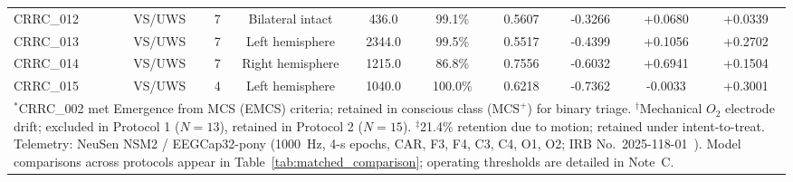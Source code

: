 \begin{table}[!ht]
\begin{tabular*}{\linewidth}{@{\extracolsep{\fill}}lccccccccc}
$$CRRC\_012 & VS/UWS & 7 & Bilateral intact & 436.0 & 99.1\% & 0.5607 & -0.3266 & +0.0680 & +0.0339 \\
CRRC\_013 & VS/UWS & 7 & Left hemisphere & 2344.0 & 99.5\% & 0.5517 & -0.4399 & +0.1056 & +0.2702 \\
CRRC\_014 & VS/UWS & 7 & Right hemisphere & 1215.0 & 86.8\% & 0.7556 & -0.6032 & +0.6941 & +0.1504 \\
CRRC\_015 & VS/UWS & 4 & Left hemisphere & 1040.0 & 100.0\% & 0.6218 & -0.7362 & -0.0033 & +0.3001 \\
\hline
\multicolumn{10}{p{\dimexpr\linewidth-2\tabcolsep\relax}}{\footnotesize $^*$CRRC\_002 met Emergence from MCS (EMCS) criteria; retained in conscious class ($\text{MCS}^+$) for binary triage. $^\dagger$Mechanical $O_2$ electrode drift; excluded in Protocol 1 ($N=13$), retained in Protocol 2 ($N=15$). $^\ddagger$21.4\% retention due to motion; retained under intent-to-treat. Telemetry: NeuSen NSM2 / EEGCap32-pony (1000~Hz, 4-s epochs, CAR, F3, F4, C3, C4, O1, O2; IRB No.~2025-118-01~\cite{duan2026auditory}). Model comparisons across protocols appear in Table~\ref{tab:matched_comparison}; operating thresholds are detailed in Note~C.} \\
\hline
\end{tabular*}
\end{table}
